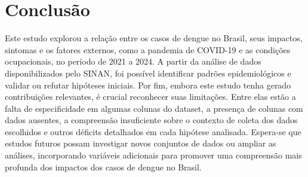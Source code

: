 \documentclass[a4paper, 12pt, twoside]{article}
\begin{document}
\section{Conclusão}


Este estudo explorou a relação entre os casos de dengue no Brasil, seus impactos, sintomas e os fatores externos, como a pandemia de COVID-19 e as condições ocupacionais, no período de 2021 a 2024. A partir da análise de dados disponibilizados pelo SINAN, foi possível identificar padrões epidemiológicos e validar ou refutar hipóteses iniciais.
Por fim, embora este estudo tenha gerado contribuições relevantes, é crucial reconhecer suas limitações. Entre elas estão a falta de especificidade em algumas colunas do dataset, a presença de colunas com dados ausentes, a compreensão insuficiente sobre o contexto de coleta dos dados escolhidos e outros déficits detalhados em cada hipótese analisada. Espera-se que estudos futuros possam investigar novos conjuntos de dados ou ampliar as análises, incorporando variáveis adicionais para promover uma compreensão mais profunda dos impactos dos casos de dengue no Brasil.


\printbibliography[title={Referências}]
\end{document}
